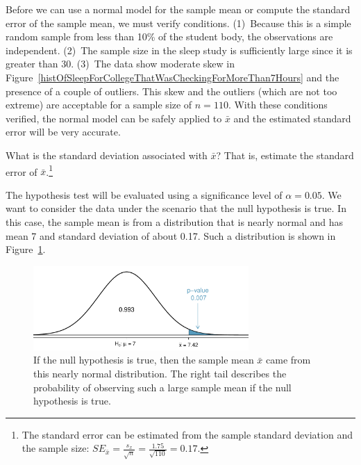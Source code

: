Before we can use a normal model for the sample mean or compute the standard error of the sample mean, we must verify conditions. (1)~Because this is a simple random sample from less than 10\% of the student body, the observations are independent. (2)~The sample size in the sleep study is sufficiently large since it is greater than 30. (3)~The data show moderate skew in Figure~\ref{histOfSleepForCollegeThatWasCheckingForMoreThan7Hours} and the presence of a couple of outliers. This skew and the outliers (which are not too extreme) are acceptable for a sample size of $n=110$. With these conditions verified, the normal model can be safely applied to $\bar{x}$ and the estimated standard error will be very accurate.

\begin{exercise} \label{findSEOfFirstSleepStudyCheckingGreaterThan7Hours}
What is the standard deviation associated with $\bar{x}$? That is, estimate the standard error of $\bar{x}$.\footnote{The standard error can be estimated from the sample standard deviation and the sample size: $SE_{\bar{x}} = \frac{s_x}{\sqrt{n}} = \frac{1.75}{\sqrt{110}} = 0.17$.}
\end{exercise}

The hypothesis test will be evaluated using a significance level of $\alpha = 0.05$. We want to consider the data under the scenario that the null hypothesis is true. In this case, the sample mean is from a distribution that is nearly normal and has mean 7 and standard deviation of about 0.17. Such a distribution is shown in Figure~\ref{pValueOneSidedSleepStudy}.

\begin{figure}[hht]
   \centering
   \includegraphics[width=0.73\textwidth]{ch_inference_foundations/figures/pValueOneSidedSleepStudy/pValueOneSidedSleepStudy}
   \caption{If the null hypothesis is true, then the sample mean $\bar{x}$ came from this nearly normal distribution. The right tail describes the probability of observing such a large sample mean if the null hypothesis is true.}
   \label{pValueOneSidedSleepStudy}
\end{figure}

